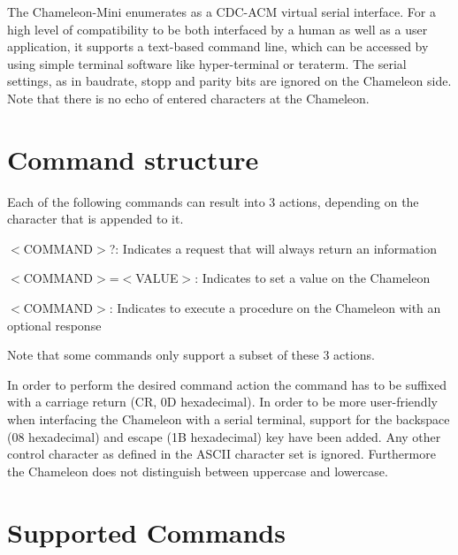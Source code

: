 The Chameleon-\/\-Mini enumerates as a C\-D\-C-\/\-A\-C\-M virtual serial interface. For a high level of compatibility to be both interfaced by a human as well as a user application, it supports a text-\/based command line, which can be accessed by using simple terminal software like hyper-\/terminal or teraterm. The serial settings, as in baudrate, stopp and parity bits are ignored on the Chameleon side. Note that there is no echo of entered characters at the Chameleon.

\section*{Command structure }

Each of the following commands can result into 3 actions, depending on the character that is appended to it.
\begin{DoxyItemize}
\item {\ttfamily $<$C\-O\-M\-M\-A\-N\-D$>$?}\-: Indicates a request that will always return an information
\item {\ttfamily $<$C\-O\-M\-M\-A\-N\-D$>$=$<$V\-A\-L\-U\-E$>$}\-: Indicates to set a value on the Chameleon
\item {\ttfamily $<$C\-O\-M\-M\-A\-N\-D$>$}\-: Indicates to execute a procedure on the Chameleon with an optional response
\end{DoxyItemize}

Note that some commands only support a subset of these 3 actions.

In order to perform the desired command action the command has to be suffixed with a carriage return (C\-R, 0\-D hexadecimal). In order to be more user-\/friendly when interfacing the Chameleon with a serial terminal, support for the backspace (08 hexadecimal) and escape (1\-B hexadecimal) key have been added. Any other control character as defined in the A\-S\-C\-I\-I character set is ignored. Furthermore the Chameleon does not distinguish between uppercase and lowercase.

\section*{Supported Commands }

